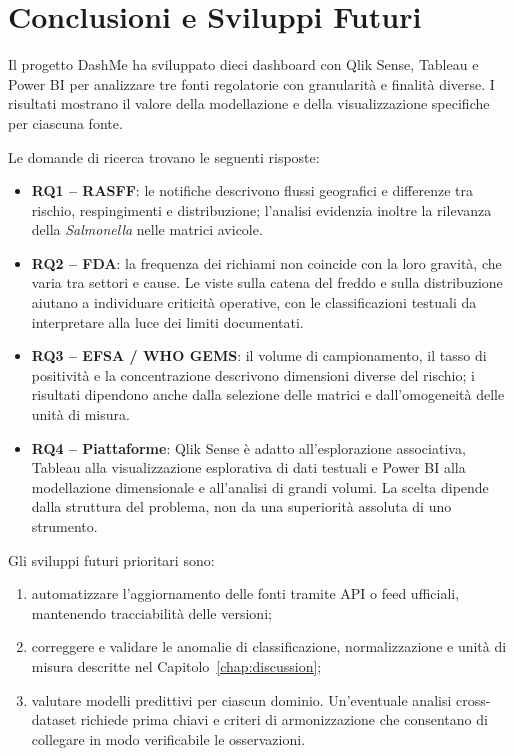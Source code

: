 \chapter{Conclusioni e Sviluppi Futuri}
\label{chap:conclusions}

Il progetto DashMe ha sviluppato dieci dashboard con Qlik Sense, Tableau e Power BI per analizzare tre fonti regolatorie con granularità e finalità diverse. I risultati mostrano il valore della modellazione e della visualizzazione specifiche per ciascuna fonte.

Le domande di ricerca trovano le seguenti risposte:
\begin{itemize}
    \item \textbf{RQ1 -- RASFF}: le notifiche descrivono flussi geografici e differenze tra rischio, respingimenti e distribuzione; l'analisi evidenzia inoltre la rilevanza della \textit{Salmonella} nelle matrici avicole.
    \item \textbf{RQ2 -- FDA}: la frequenza dei richiami non coincide con la loro gravità, che varia tra settori e cause. Le viste sulla catena del freddo e sulla distribuzione aiutano a individuare criticità operative, con le classificazioni testuali da interpretare alla luce dei limiti documentati.
    \item \textbf{RQ3 -- EFSA / WHO GEMS}: il volume di campionamento, il tasso di positività e la concentrazione descrivono dimensioni diverse del rischio; i risultati dipendono anche dalla selezione delle matrici e dall'omogeneità delle unità di misura.
    \item \textbf{RQ4 -- Piattaforme}: Qlik Sense è adatto all'esplorazione associativa, Tableau alla visualizzazione esplorativa di dati testuali e Power BI alla modellazione dimensionale e all'analisi di grandi volumi. La scelta dipende dalla struttura del problema, non da una superiorità assoluta di uno strumento.
\end{itemize}

Gli sviluppi futuri prioritari sono:
\begin{enumerate}
    \item automatizzare l'aggiornamento delle fonti tramite API o feed ufficiali, mantenendo tracciabilità delle versioni;
    \item correggere e validare le anomalie di classificazione, normalizzazione e unità di misura descritte nel Capitolo~\ref{chap:discussion};
    \item valutare modelli predittivi per ciascun dominio. Un'eventuale analisi cross-dataset richiede prima chiavi e criteri di armonizzazione che consentano di collegare in modo verificabile le osservazioni.
\end{enumerate}
